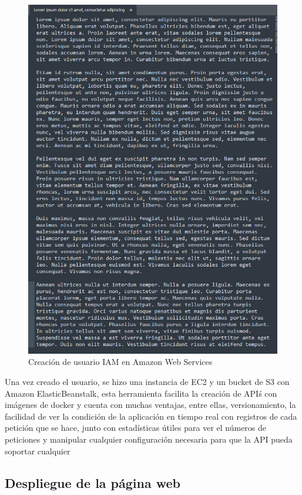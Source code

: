 \documentclass[12pt, a4paper, titlepage]{report}
\begin{document}
\begin{figure}[H]
	\includegraphics[width=12cm]{./imagenes/Desarrollo/AplicacionWeb/Archivo.png}
	\centering 
	\caption{Creación de usuario IAM en Amazon Web Services}
\end{figure}

Una vez creado el usuario, se hizo una instancia de EC2 y un bucket de S3 con Amazon ElasticBeanstalk, esta herramienta facilita la creación de API\'s con imágenes de docker y cuenta con muchas ventajas, entre ellas, versionamiento, la facilidad de ver la condición de la aplicación en tiempo real con registros de cada petición que se hace, junto con estadísticas útiles para ver el números de peticiones y manipular cualquier configuración necesaria para que la API pueda soportar cualquier


\subsection{Despliegue de la página web}
\end{document}

